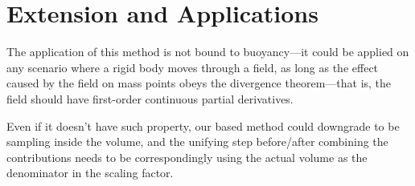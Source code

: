 \section{Extension and Applications}

The application of this method is not bound to buoyancy---it could be applied on any scenario where a rigid body moves through a field, as long as the effect caused by the field on mass points obeys the divergence theorem---that is, the field should have first-order continuous partial derivatives.

Even if it doesn't have such property, our based method could downgrade to be sampling inside the volume, and the unifying step before/after combining the contributions needs to be correspondingly using the actual volume as the denominator in the scaling factor.

